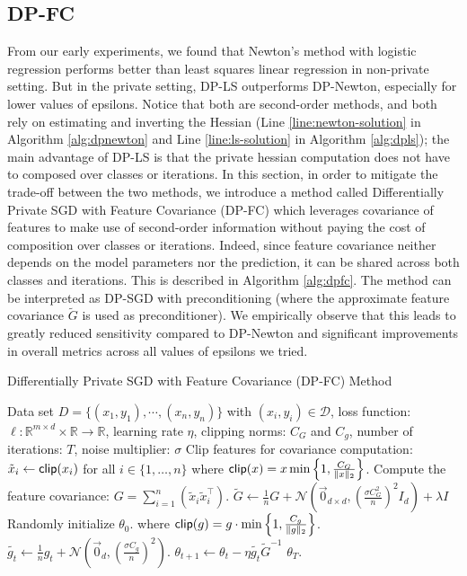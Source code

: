 \documentclass[letterpaper]{article} \usepackage{fullpage}
\def\cD{\mathcal{D}}
\def\calN{\mathcal{N}}
\def\cardD{n}
\begin{document}
\subsection{DP-FC}
From our early experiments, we found that Newton's method with logistic regression performs better than least squares linear regression in non-private setting. But in the private setting, DP-LS outperforms DP-Newton, especially for lower values of epsilons. Notice that both are second-order methods, and both rely on estimating and inverting the Hessian (Line \ref{line:newton-solution} in Algorithm \ref{alg:dpnewton} and Line \ref{line:ls-solution} in Algorithm \ref{alg:dpls}); the main advantage of DP-LS is that the private hessian computation does not have to composed over classes or iterations. In this section, in order to mitigate the trade-off between the two methods, we introduce a method called Differentially Private SGD with Feature Covariance (DP-FC) which leverages covariance of features to make use of second-order information without paying the cost of composition over classes or iterations. Indeed, since feature covariance neither depends on the model parameters nor the prediction, it can be shared across both classes and iterations. This is described in Algorithm \ref{alg:dpfc}. The method can be interpreted as DP-SGD with preconditioning (where the approximate feature covariance $\tilde G$ is used as preconditioner). We empirically observe that this leads to greatly reduced sensitivity compared to DP-Newton and significant improvements in overall metrics across all values of epsilons we tried.


\begin{algorithm}[ht]
\caption{Differentially Private SGD with Feature Covariance (DP-FC) Method}
\begin{algorithmic}[1]
\REQUIRE Data set $D=\{(x_1, y_1),\cdots,(x_n, y_n)\}$ with $(x_i, y_i)\in \cD$, loss function: $\ell:\mathbb{R}^{m\times d}\times\mathbb{R}\to\mathbb{R}$, learning rate $\eta$, clipping norms: $C_G$ and $C_g$, number of iterations: $T$, noise multiplier: $\sigma$
\STATE Clip features for covariance computation: $\tilde x_i\leftarrow {\sf clip}(x_i)$ for all $i\in\{1,\dots,n\}$ where ${\sf clip}(x)=x\min\left\{1,\frac{C_G}{\|x\|_{2}}\right\}$.
\STATE Compute the feature covariance: $G = \sum_{i=1}^n (\tilde x_i\tilde x_i^\top)$.
\STATE $\tilde G \leftarrow \frac{1}{\cardD}G + \calN\left(\vec{0}_{d\times d},(\frac{\sigma C_G^2}{\cardD})^2I_d\right) + \lambda I$ \label{line:Sigmafc}
\STATE Randomly initialize $\theta_0$.
{ where {${\sf clip}(g)=g\cdot \min\left\{1,\frac{C_g}{\|g\|_{2}}\right\}$}.}
\STATE $\tilde{g_{t}} \leftarrow \frac{1}{\cardD} g_t+\calN\left(\vec{0}_{d},(\frac{\sigma C_g}{\cardD})^2\right)$. \label{line:gradNfc}
{\STATE $\theta_{t+1} \leftarrow \theta_t - \eta  \tilde{g_{t}} {\tilde{G}}^{-1}$}
\ENDFOR
{ $\theta_T$\label{eq:lastDPSGD}.}
\end{algorithmic}
\label{alg:dpfc}
\end{algorithm}
\end{document}
